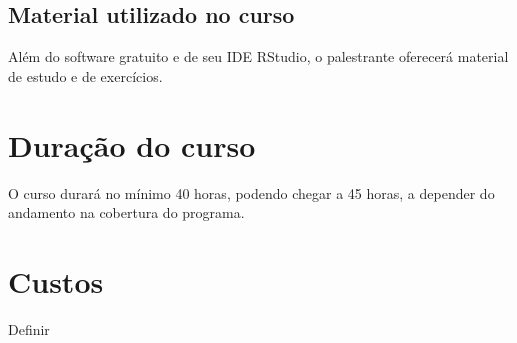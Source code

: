 \documentclass[12pt,]{article}
\begin{document}
\subsection{Material utilizado no
curso}\label{material-utilizado-no-curso}

Além do software gratuito e de seu IDE RStudio, o palestrante oferecerá
material de estudo e de exercícios.

\section{Duração do curso}\label{duracao-do-curso}

O curso durará no mínimo 40 horas, podendo chegar a 45 horas, a depender
do andamento na cobertura do programa.

\section{Custos}\label{custos}

Definir
\end{document}
